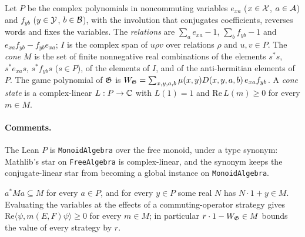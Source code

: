 \begin{definition}
\label{def:measurement-algebra}
\leanok
Let $P$ be the complex polynomials in noncommuting variables $e_{xa}$ ($x \in \mathcal{X}$,
$a \in \mathcal{A}$) and $f_{yb}$ ($y \in \mathcal{Y}$, $b \in \mathcal{B}$), with the involution that conjugates
coefficients, reverses words and fixes the variables. The \emph{relations} are
$\sum_a e_{xa} - 1$, $\sum_b f_{yb} - 1$ and $e_{xa} f_{yb} - f_{yb} e_{xa}$; $I$ is the
complex span of $u \rho v$ over relations $\rho$ and $u, v \in P$. The \emph{cone} $M$ is the
set of finite nonnegative real combinations of the elements $s^* s$, $s^* e_{xa} s$,
$s^* f_{yb} s$ ($s \in P$), of the elements of $I$, and of the anti-hermitian elements of
$P$. The game polynomial of $\mathfrak{G}$ is $W_{\mathfrak{G}} = \sum_{x,y,a,b} \mu(x,y) D(x,y,a,b)\,
e_{xa} f_{yb}$. A \emph{cone state} is a complex-linear $L : P \to \mathbb{C}$ with $L(1) = 1$ and
$\mathrm{Re}\, L(m) \geq 0$ for every $m \in M$.
\end{definition}

\paragraph{Comments.} The Lean $P$ is \texttt{MonoidAlgebra} over the free monoid, under a
type synonym: Mathlib's star on \texttt{FreeAlgebra} is complex-linear, and the synonym keeps
the conjugate-linear star from becoming a global instance on \texttt{MonoidAlgebra}.

\begin{lemma}
\label{lem:cone-archimedean}
\leanok
$a^* M a \subseteq M$ for every $a \in P$, and for every $y \in P$ some real $N$ has
$N \cdot 1 + y \in M$. Evaluating the variables at the effects of a commuting-operator
strategy gives $\mathrm{Re} \langle \psi, m(E, F) \psi \rangle \geq 0$ for every $m \in M$;
in particular $r \cdot 1 - W_{\mathfrak{G}} \in M$ bounds the value of every strategy by $r$.
\end{lemma}

